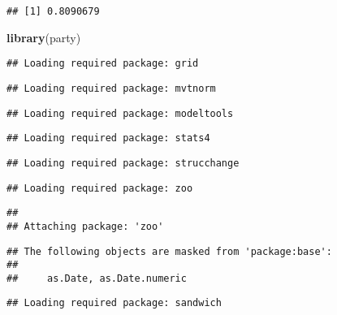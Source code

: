 \documentclass[
]{article}
\newenvironment{Shaded}{\begin{snugshade}}{\end{snugshade}}
\newcommand{\CommentTok}[1]{\textcolor[rgb]{0.56,0.35,0.01}{\textit{#1}}}
\newcommand{\DataTypeTok}[1]{\textcolor[rgb]{0.13,0.29,0.53}{#1}}
\newcommand{\KeywordTok}[1]{\textcolor[rgb]{0.13,0.29,0.53}{\textbf{#1}}}
\newcommand{\NormalTok}[1]{#1}
\newcommand{\OperatorTok}[1]{\textcolor[rgb]{0.81,0.36,0.00}{\textbf{#1}}}
\newcommand{\StringTok}[1]{\textcolor[rgb]{0.31,0.60,0.02}{#1}}
\begin{document}
\begin{verbatim}
## [1] 0.8090679
\end{verbatim}

\begin{Shaded}
\begin{Highlighting}[]
\KeywordTok{library}\NormalTok{(party)}
\end{Highlighting}
\end{Shaded}

\begin{verbatim}
## Loading required package: grid
\end{verbatim}

\begin{verbatim}
## Loading required package: mvtnorm
\end{verbatim}

\begin{verbatim}
## Loading required package: modeltools
\end{verbatim}

\begin{verbatim}
## Loading required package: stats4
\end{verbatim}

\begin{verbatim}
## Loading required package: strucchange
\end{verbatim}

\begin{verbatim}
## Loading required package: zoo
\end{verbatim}

\begin{verbatim}
## 
## Attaching package: 'zoo'
\end{verbatim}

\begin{verbatim}
## The following objects are masked from 'package:base':
## 
##     as.Date, as.Date.numeric
\end{verbatim}

\begin{verbatim}
## Loading required package: sandwich
\end{verbatim}

\begin{Shaded}
\end{Shaded}
\end{document}
